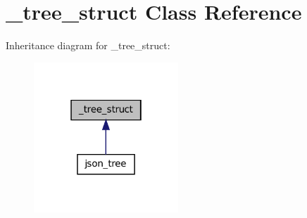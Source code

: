 \hypertarget{class__tree__struct}{
\section{\_\-tree\_\-struct Class Reference}
\label{class__tree__struct}
}


Inheritance diagram for \_\-tree\_\-struct:\nopagebreak
\begin{figure}[H]
\begin{center}
\leavevmode
\includegraphics[width=154pt]{class__tree__struct__inherit__graph}
\end{center}
\end{figure}
